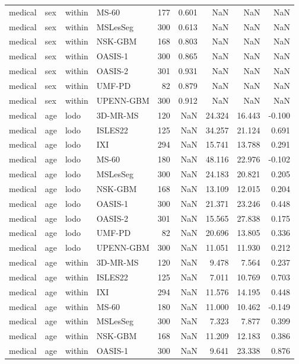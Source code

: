 \begin{tabular}{llllrrrrr}
medical & sex & within & MS-60 & 177 & 0.601 & NaN & NaN & NaN \\
medical & sex & within & MSLesSeg & 300 & 0.613 & NaN & NaN & NaN \\
medical & sex & within & NSK-GBM & 168 & 0.803 & NaN & NaN & NaN \\
medical & sex & within & OASIS-1 & 300 & 0.865 & NaN & NaN & NaN \\
medical & sex & within & OASIS-2 & 301 & 0.931 & NaN & NaN & NaN \\
medical & sex & within & UMF-PD & 82 & 0.879 & NaN & NaN & NaN \\
medical & sex & within & UPENN-GBM & 300 & 0.912 & NaN & NaN & NaN \\
medical & age & lodo & 3D-MR-MS & 120 & NaN & 24.324 & 16.443 & -0.100 \\
medical & age & lodo & ISLES22 & 125 & NaN & 34.257 & 21.124 & 0.691 \\
medical & age & lodo & IXI & 294 & NaN & 15.741 & 13.788 & 0.291 \\
medical & age & lodo & MS-60 & 180 & NaN & 48.116 & 22.976 & -0.102 \\
medical & age & lodo & MSLesSeg & 300 & NaN & 24.183 & 20.821 & 0.205 \\
medical & age & lodo & NSK-GBM & 168 & NaN & 13.109 & 12.015 & 0.204 \\
medical & age & lodo & OASIS-1 & 300 & NaN & 21.371 & 23.246 & 0.448 \\
medical & age & lodo & OASIS-2 & 301 & NaN & 15.565 & 27.838 & 0.175 \\
medical & age & lodo & UMF-PD & 82 & NaN & 20.696 & 13.805 & 0.336 \\
medical & age & lodo & UPENN-GBM & 300 & NaN & 11.051 & 11.930 & 0.212 \\
medical & age & within & 3D-MR-MS & 120 & NaN & 9.478 & 7.564 & 0.237 \\
medical & age & within & ISLES22 & 125 & NaN & 7.011 & 10.769 & 0.703 \\
medical & age & within & IXI & 294 & NaN & 11.576 & 14.195 & 0.448 \\
medical & age & within & MS-60 & 180 & NaN & 11.000 & 10.462 & -0.149 \\
medical & age & within & MSLesSeg & 300 & NaN & 7.323 & 7.877 & 0.399 \\
medical & age & within & NSK-GBM & 168 & NaN & 11.209 & 12.183 & 0.386 \\
medical & age & within & OASIS-1 & 300 & NaN & 9.641 & 23.338 & 0.876 \\

\end{tabular}
